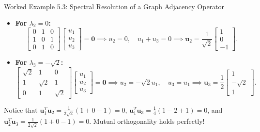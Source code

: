 \begin{examplebox}{Worked Example 5.3: Spectral Resolution of a Graph Adjacency Operator}
\begin{itemize}
    \item \textbf{For $\lambda_2 = 0$:}
    \begin{equation}
    \begin{bmatrix} 0 & 1 & 0 \\ 1 & 0 & 1 \\ 0 & 1 & 0 \end{bmatrix} \begin{bmatrix} u_1 \\ u_2 \\ u_3 \end{bmatrix} = \mathbf{0} \implies u_2 = 0, \quad u_1 + u_3 = 0 \implies \mathbf{u}_2 = \frac{1}{\sqrt{2}}\begin{bmatrix} 1 \\ 0 \\ -1 \end{bmatrix}.
    \end{equation}

    \item \textbf{For $\lambda_3 = -\sqrt{2}$:}
    \begin{equation}
    \begin{bmatrix} \sqrt{2} & 1 & 0 \\ 1 & \sqrt{2} & 1 \\ 0 & 1 & \sqrt{2} \end{bmatrix} \begin{bmatrix} u_1 \\ u_2 \\ u_3 \end{bmatrix} = \mathbf{0} \implies u_2 = -\sqrt{2} u_1, \quad u_3 = u_1 \implies \mathbf{u}_3 = \frac{1}{2}\begin{bmatrix} 1 \\ -\sqrt{2} \\ 1 \end{bmatrix}.
    \end{equation}
\end{itemize}
Notice that $\mathbf{u}_1^T \mathbf{u}_2 = \frac{1}{2\sqrt{2}}(1 + 0 - 1) = 0$, $\mathbf{u}_1^T \mathbf{u}_3 = \frac{1}{4}(1 - 2 + 1) = 0$, and $\mathbf{u}_2^T \mathbf{u}_3 = \frac{1}{2\sqrt{2}}(1 + 0 - 1) = 0$. Mutual orthogonality holds perfectly!


\end{examplebox}
